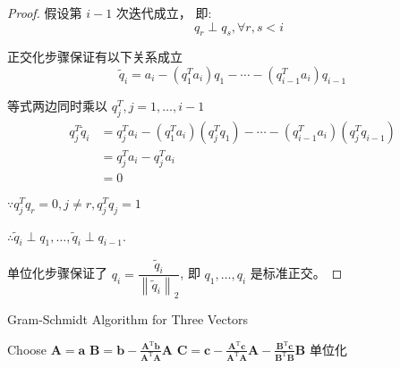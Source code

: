 \begin{proof}
    假设第 $ i-1 $ 次迭代成立，  即: \begin{equation} \quad q_{r} \perp q_{s}, \forall r, s<i \end{equation}

    正交化步骤保证有以下关系成立
    \begin{equation} \widetilde{q}_{i}=a_{i}-\left(q_{1}^{T} a_{i}\right) q_{1}-\cdots-\left(q_{i-1}^{T} a_{i}\right) q_{i-1} \end{equation}

    等式两边同时乘以 $ q_{j}^{T}, j=1, \ldots, i-1 $
    \begin{equation} \begin{aligned} q_{j}^{T} \tilde{q}_{i} &=q_{j}^{T} a_{i}-\left(q_{1}^{T} a_{i}\right)\left(q_{j}^{T} q_{1}\right)-\cdots-\left(q_{i-1}^{T} a_{i}\right)\left(q_{j}^{T} q_{i-1}\right) \\ &=q_{j}^{T} a_{i}-q_{j}^{T} a_{i}
        \\ &=0  \end{aligned} \end{equation}

    $ \because q_{j}^{T} q_{r}=0, j \neq r, q_{j}^{T} q_{j}=1 $

     $\therefore \widetilde{q}_{i} \perp q_{1}, \ldots, \widetilde{q}_{i} \perp q_{i-1} $.

    单位化步骤保证了 $
    q_{i}=\dfrac{\widetilde{q}_{i}}{\left\|\widetilde{q}_{i}\right\|_{2}}$, 即 $ q_{1}, \ldots, q_{i} $ 是标准正交。 
\end{proof}

\begin{algorithm}[htbp]
    \caption{Gram-Schmidt Algorithm for Three Vectors}
    Choose $ \boldsymbol{A}=\boldsymbol{a} $\;
    $ \boldsymbol{B}=\boldsymbol{b}-\frac{\boldsymbol{A}^{\mathrm{T}} \boldsymbol{b}}{\boldsymbol{A}^{\mathrm{T}} \boldsymbol{A}} \boldsymbol{A} $\;
    $ \boldsymbol{C}=\boldsymbol{c}-\frac{\boldsymbol{A}^{\mathrm{T}} \boldsymbol{c}}{\boldsymbol{A}^{\mathrm{T}} \boldsymbol{A}} \boldsymbol{A}-\frac{\boldsymbol{B}^{\mathrm{T}} \boldsymbol{c}}{\boldsymbol{B}^{\mathrm{T}} \boldsymbol{B}} \boldsymbol{B}   $\;
    单位化\;
\end{algorithm}

